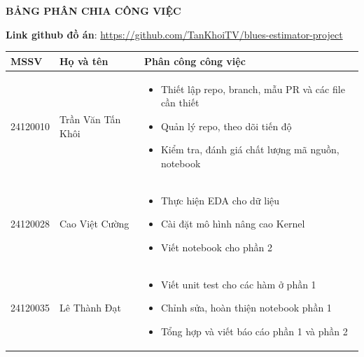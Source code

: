 \newpage

\begin{center}
    \Large\textbf{BẢNG PHÂN CHIA CÔNG VIỆC}
\end{center}

\noindent\textbf{Link github đồ án}: \url{https://github.com/TanKhoiTV/blues-estimator-project}

\begin{table}[H]
    \centering
    \renewcommand{\arraystretch}{1.3}
    \setlength{\tabcolsep}{6pt}
    \setlength{\arrayrulewidth}{1pt}

    \begin{tabularx}{\textwidth}{|p{2cm}|p{4cm}|X|}
        \hline
        \rowcolor[rgb]{0.8, 0.9, 1.0}
        \textbf{MSSV} & \textbf{Họ và tên} & \textbf{Phân công công việc} \\ \hline

        24120010 & Trần Văn Tấn Khôi &
        \vspace{-0.5\baselineskip}
        \begin{itemize}[itemsep=0pt, topsep=0pt, partopsep=0pt, parsep=0pt]
            \item Thiết lập repo, branch, mẫu PR và các file cần thiết
            \item Quản lý repo, theo dõi tiến độ
            \item Kiểm tra, đánh giá chất lượng mã nguồn, notebook
        \end{itemize} \\ \hline

        24120028 & Cao Việt Cường & 
        \vspace{-0.5\baselineskip}
        \begin{itemize}[itemsep=0pt, topsep=0pt, partopsep=0pt, parsep=0pt]
            \item Thực hiện EDA cho dữ liệu
            \item Cài đặt mô hình nâng cao Kernel
            \item Viết notebook cho phần 2
        \end{itemize} \\ \hline

        24120035 & Lê Thành Đạt & 
        \vspace{-0.5\baselineskip}
        \begin{itemize}[itemsep=0pt, topsep=0pt, partopsep=0pt, parsep=0pt]
            \item Viết unit test cho các hàm ở phần 1
            \item Chỉnh sửa, hoàn thiện notebook phần 1
            \item Tổng hợp và viết báo cáo phần 1 và phần 2
        \end{itemize} \\ \hline


\end{tabularx}
\end{table}
